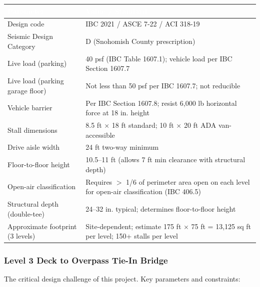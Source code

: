 \documentclass[11pt,letterpaper]{article}
\newcommand{\tableheader}[1]{\textbf{\sffamily\textcolor{white}{#1}}}
\begin{document}
\begin{center}
\begin{tabularx}{\textwidth}{L{4.5cm}X}
\toprule
{}
\tableheader{Parameter} & \tableheader{Value / Standard} \\
\midrule
Design code & IBC 2021 / ASCE 7-22 / ACI 318-19 \\
Seismic Design Category & D (Snohomish County prescription) \\
Live load (parking) & 40 psf (IBC Table 1607.1); vehicle load per IBC Section 1607.7 \\
Live load (parking garage floor) & Not less than 50 psf per IBC 1607.7; not reducible \\
Vehicle barrier & Per IBC Section 1607.8; resist 6,000 lb horizontal force at 18 in. height \\
Stall dimensions & 8.5 ft $\times$ 18 ft standard; 10 ft $\times$ 20 ft ADA van-accessible \\
Drive aisle width & 24 ft two-way minimum \\
Floor-to-floor height & 10.5--11 ft (allows 7 ft min clearance with structural depth) \\
Open-air classification & Requires $>$ 1/6 of perimeter area open on each level for open-air classification (IBC 406.5) \\
Structural depth (double-tee) & 24--32 in. typical; determines floor-to-floor height \\
Approximate footprint (3 levels) & Site-dependent; estimate 175 ft $\times$ 75 ft = 13,125 sq ft per level; 150+ stalls per level \\
\bottomrule
\end{tabularx}
\end{center}

\subsubsection{Level 3 Deck to Overpass Tie-In Bridge}

The critical design challenge of this project. Key parameters and constraints:
\end{document}
